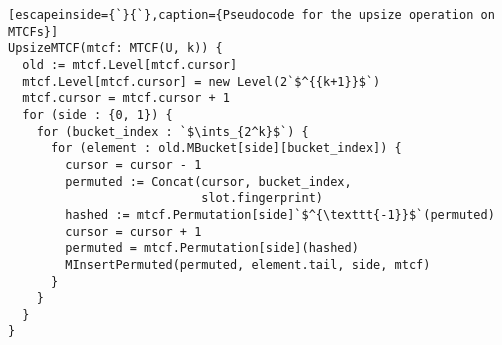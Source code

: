 \documentclass[sigconf, nonacm]{acmart}
\newcommand{\ints}{\mathbb{Z}}
\newcommand{\dotcup}{\ensuremath{\mathaccent\cdot\cup}}
\begin{document}
\begin{lstlisting}[escapeinside={`}{`},caption={Pseudocode for the upsize operation on MTCFs}]
UpsizeMTCF(mtcf: MTCF(U, k)) {
  old := mtcf.Level[mtcf.cursor]
  mtcf.Level[mtcf.cursor] = new Level(2`$^{{k+1}}$`)
  mtcf.cursor = mtcf.cursor + 1
  for (side : {0, 1}) {
    for (bucket_index : `$\ints_{2^k}$`) {
      for (element : old.MBucket[side][bucket_index]) {
        cursor = cursor - 1
        permuted := Concat(cursor, bucket_index,
                           slot.fingerprint)
        hashed := mtcf.Permutation[side]`$^{\texttt{-1}}$`(permuted)
        cursor = cursor + 1
        permuted = mtcf.Permutation[side](hashed)
        MInsertPermuted(permuted, element.tail, side, mtcf)
      }
    }
  }
}
\end{lstlisting}



\end{document}
